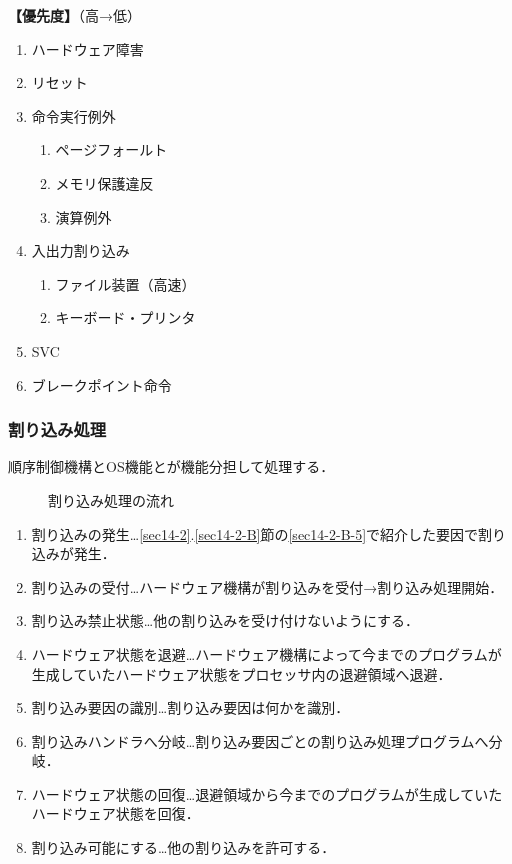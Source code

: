 \noindent\textbf{【優先度】}（高→低）
\begin{enumerate}[label={\color{gray}●}, labelsep=10pt, leftmargin=23pt]
	\item ハードウェア障害
	\item リセット
	\item 命令実行例外
		\begin{enumerate}[label={\color{gray}○}, labelsep=10pt, leftmargin=23pt]
			\item ページフォールト
			\item メモリ保護違反
			\item 演算例外
		\end{enumerate}
	\item 入出力割り込み
		\begin{enumerate}[label={\color{gray}○}, labelsep=10pt, leftmargin=23pt]
			\item ファイル装置（高速）
			\item キーボード・プリンタ
		\end{enumerate}
	\item SVC
	\item ブレークポイント命令
\end{enumerate}



\subsubsection{割り込み処理}

順序制御機構とOS機能とが機能分担して処理する．

\begin{figure}[H]
	\begin{center}
		\caption{割り込み処理の流れ}
		\label{fig14-1}
	\end{center}
\end{figure}

\begin{enumerate}[label=\arabic*., labelsep=10pt, leftmargin=23pt]
	\item 割り込みの発生…\ref{sec14-2}.\ref{sec14-2-B}節の\ref{sec14-2-B-5}で紹介した要因で割り込みが発生．
	\item 割り込みの受付…ハードウェア機構が割り込みを受付→割り込み処理開始．
	\item 割り込み禁止状態…他の割り込みを受け付けないようにする．
	\item ハードウェア状態を退避…ハードウェア機構によって今までのプログラムが生成していたハードウェア状態をプロセッサ内の退避領域へ退避．
	\item 割り込み要因の識別…割り込み要因は何かを識別．
	\item 割り込みハンドラへ分岐…割り込み要因ごとの割り込み処理プログラムへ分岐．
	\item ハードウェア状態の回復…退避領域から今までのプログラムが生成していたハードウェア状態を回復．
	\item 割り込み可能にする…他の割り込みを許可する．
\end{enumerate}



